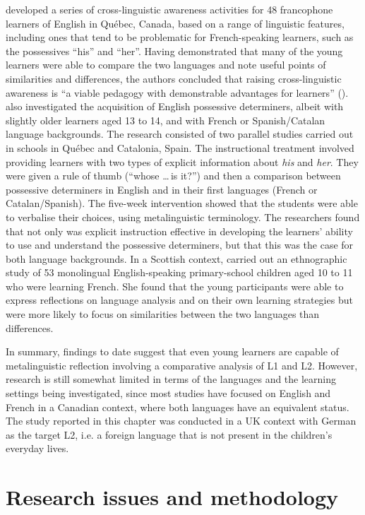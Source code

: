 \documentclass[output=paper]{langscibook}
\begin{document}
\citet{HorstEtAl2010} developed a series of cross-linguistic awareness activities for 48 francophone learners of English in Québec, Canada, based on a range of linguistic features, including ones that tend to be problematic for French-speaking learners, such as the possessives ``his'' and ``her''. Having demonstrated that many of the young learners were able to compare the two languages and note useful points of similarities and differences, the authors concluded that raising cross-linguistic awareness is “a viable pedagogy with demonstrable advantages for learners” (\citealt[347]{HorstEtAl2010}). \citet{WhiteEtAl2007} also investigated the acquisition of English possessive determiners, albeit with slightly older learners aged 13 to 14, and with French or Spanish/Catalan language backgrounds. The research consisted of two parallel studies carried out in schools in Québec and Catalonia, Spain. The instructional treatment involved providing learners with two types of explicit information about \textit{his} and \textit{her}. They were given a rule of thumb (``whose \ldots\,is it?'') and then a comparison between possessive determiners in English and in their first languages (French or Catalan/Spanish). The five-week intervention showed that the students were able to verbalise their choices, using metalinguistic terminology. The researchers found that not only was explicit instruction effective in developing the learners’ ability to use and understand the possessive determiners, but that this was the case for both language backgrounds. In a Scottish context, \citet{Kanaki2020} carried out an ethnographic study of 53 monolingual English-speaking primary-school children aged 10 to 11 who were learning French. She found that the young participants were able to express reflections on language analysis and on their own learning strategies but were more likely to focus on similarities between the two languages than differences.

In summary, findings to date suggest that even young learners are capable of metalinguistic reflection involving a comparative analysis of L1 and L2. However, research is still somewhat limited in terms of the languages and the learning settings being investigated, since most studies have focused on English and French in a Canadian context, where both languages have an equivalent status. The study reported in this chapter was conducted in a UK context with German as the target L2, i.e. a foreign language that is not present in the children’s everyday lives.

\section{Research issues and methodology}
\end{document}
